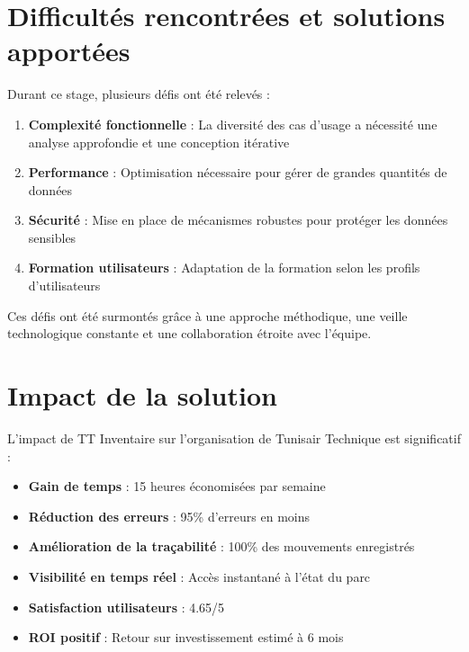\section*{Difficultés rencontrées et solutions apportées}

Durant ce stage, plusieurs défis ont été relevés :

\begin{enumerate}
    \item \textbf{Complexité fonctionnelle} : La diversité des cas d'usage a nécessité une analyse approfondie et une conception itérative
    
    \item \textbf{Performance} : Optimisation nécessaire pour gérer de grandes quantités de données
    
    \item \textbf{Sécurité} : Mise en place de mécanismes robustes pour protéger les données sensibles
    
    \item \textbf{Formation utilisateurs} : Adaptation de la formation selon les profils d'utilisateurs
\end{enumerate}

Ces défis ont été surmontés grâce à une approche méthodique, une veille technologique constante et une collaboration étroite avec l'équipe.

\section*{Impact de la solution}

L'impact de TT Inventaire sur l'organisation de Tunisair Technique est significatif :

\begin{itemize}
    \item \textbf{Gain de temps} : 15 heures économisées par semaine
    \item \textbf{Réduction des erreurs} : 95\% d'erreurs en moins
    \item \textbf{Amélioration de la traçabilité} : 100\% des mouvements enregistrés
    \item \textbf{Visibilité en temps réel} : Accès instantané à l'état du parc
    \item \textbf{Satisfaction utilisateurs} : 4.65/5
    \item \textbf{ROI positif} : Retour sur investissement estimé à 6 mois
\end{itemize}

